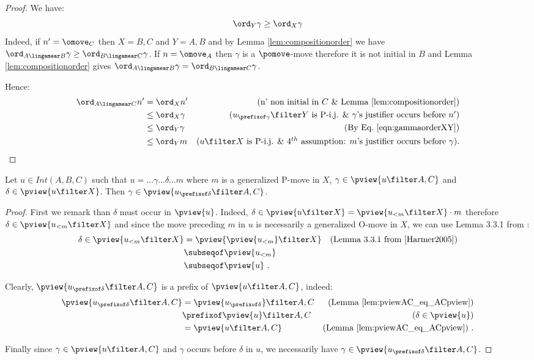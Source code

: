 \begin{proof}
We have:
\begin{equation}
\ord_Y \gamma \geq \ord_X \gamma \label{eqn:gammaorderXY}
\end{equation}
Indeed, if $n' =\omove_C$ then $X=B,C$ and $Y=A,B$ and by Lemma
\ref{lem:compositionorder} we have $\ord_{A\lingamear B} \gamma \geq
\ord_{B\lingamear C} \gamma$. If $n=\omove_A$ then $\gamma$ is a
$\pomove$-move therefore it is not initial in $B$ and Lemma
\ref{lem:compositionorder} gives $\ord_{A\lingamear B} \gamma =
\ord_{B\lingamear C} \gamma$.

Hence:
\begin{align*}
\ord_{A\lingamear C} n'
& = \ord_{X} n' & \mbox{(n' non initial in $C$ \& Lemma \ref{lem:compositionorder})} \\
& \leq \ord_{X} \gamma & \mbox{($u_{\prefixof \gamma}\filter Y$ is P-i.j. \& $\gamma$'s justifier occurs before $n'$)} \\
& \leq \ord_{Y} \gamma & \mbox{(By Eq.\ \ref{eqn:gammaorderXY})} \\
& \leq \ord_{Y} m & \mbox{($u\filter X$ is P-i.j. \&
4$^{th}$ assumption: $m$'s justifier occurs before $\gamma$)}.
\end{align*}
\end{proof}


\begin{lemma}
\label{lem:visibleatprefixofu}
Let $u\in Int(A,B,C)$ such that
$u = \ldots \gamma \ldots \delta \ldots m$
where $m$ is a generalized P-move in $X$,
$\gamma \in \pview{u\filter A,C}$  and $\delta \in \pview{u\filter X}$. Then $\gamma \in \pview{u_{\prefixof \delta} \filter A,C}$.
\end{lemma}
\begin{proof}
First we remark than $\delta$ must occur in $\pview{u}$.
Indeed, $\delta \in \pview{u\filter X} = \pview{u_{< m} \filter X} \cdot m$ therefore $\delta \in \pview{u_{< m} \filter X}$ and since the move preceding $m$ in $u$ is necessarily a generalized O-move in $X$, we can use Lemma 3.3.1 from \cite{Harmer2005}:
\begin{align*}
\delta \in \pview{u_{< m} \filter X}
&= \pview{\pview{u_{<m}}\filter X} & \mbox{(Lemma 3.3.1 from \cite{Harmer2005})}\\
&\subseqof \pview{u_{<m}} \\
&\subseqof \pview{u} \ .
\end{align*}

Clearly, $\pview{u_{\prefixof \delta} \filter A,C}$ is a prefix of $\pview{u \filter A,C}$, indeed:
\begin{align*}
\pview{u_{\prefixof \delta} \filter A,C}
& = \pview{u_{\prefixof \delta}}\filter A,C
  & \mbox{(Lemma \ref{lem:pviewAC_eq_ACpview})}  \\
& \prefixof \pview{u}\filter A,C
  & \mbox{($\delta \in \pview{u}$)} \\
& = \pview{u\filter A,C}
  & \mbox{(Lemma \ref{lem:pviewAC_eq_ACpview})} \ .
\end{align*}

Finally since $\gamma \in \pview{u\filter A,C}$ and $\gamma$ occurs before $\delta$ in $u$, we necessarily have $\gamma \in \pview{u_{\prefixof \delta}\filter A,C}$.
\end{proof}

